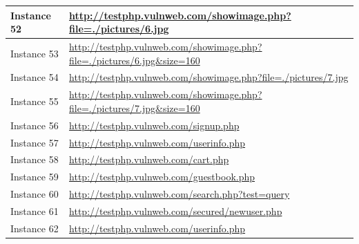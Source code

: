 \documentclass[12pt]{article}
\begin{document}
\begin{center}
\begin{longtable}{|l|p{10cm}|}
\hline
Instance 52 & \url{http://testphp.vulnweb.com/showimage.php?file=./pictures/6.jpg} \\
\hline
Instance 53 & \url{http://testphp.vulnweb.com/showimage.php?file=./pictures/6.jpg\&size=160} \\
\hline
Instance 54 & \url{http://testphp.vulnweb.com/showimage.php?file=./pictures/7.jpg} \\
\hline
Instance 55 & \url{http://testphp.vulnweb.com/showimage.php?file=./pictures/7.jpg\&size=160} \\
\hline
Instance 56 & \url{http://testphp.vulnweb.com/signup.php} \\
\hline
Instance 57 & \url{http://testphp.vulnweb.com/userinfo.php} \\
\hline
Instance 58 & \url{http://testphp.vulnweb.com/cart.php} \\
\hline
Instance 59 & \url{http://testphp.vulnweb.com/guestbook.php} \\
\hline
Instance 60 & \url{http://testphp.vulnweb.com/search.php?test=query} \\
\hline
Instance 61 & \url{http://testphp.vulnweb.com/secured/newuser.php} \\
\hline
Instance 62 & \url{http://testphp.vulnweb.com/userinfo.php} \\
\hline
\end{longtable}
\end{center}\vspace{0.7cm}
\end{document}
